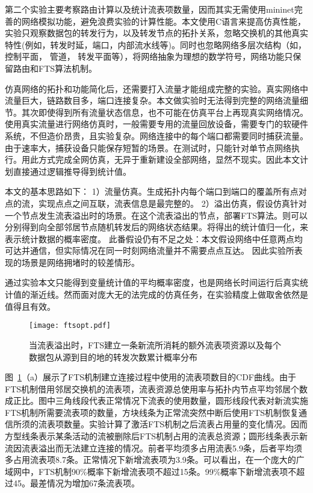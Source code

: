 第二个实验主要考察路由计算以及统计流表项数量，因而其实无需使用mininet完善的网络模拟功能，避免浪费实验的计算性能。本文使用C语言来提高仿真性能，实验只观察数据包的转发行为，以及转发节点的拓扑关系，忽略交换机的其他真实特性(例如，转发时延，端口，内部流水线等)。同时也忽略网络多层次结构（如，控制平面， 管道， 转发平面等），将网络抽象为理想的数学符号，网络功能只保留路由和FTS算法机制。

仿真网络的拓扑和功能简化后，还需要打入流量才能组成完整的实验。真实网络中流量巨大，链路数目多，端口连接复杂。本文做实验时无法得到完整的网络流量细节。其次即使得到所有流量状态信息，也不可能在仿真平台上再现真实网络情况。使用真实流量进行网络仿真时，一般需要专用的流量回放设备，需要专门的软硬件系统，不但造价昂贵，且实验复杂。网络连接中的每个端口都需要同时捕获流量。由于速率大，捕获设备只能保存短暂的场景。在测试时，只能针对单节点网络执行。用此方式完成全网仿真，无异于重新建设全部网络，显然不现实。因此本文计划直接通过逻辑推导得到统计值。

本文的基本思路如下：
1）流量仿真。生成拓扑内每个端口到端口的覆盖所有点对点的流，实现点点之间互联，流表信息是最完整的。
2）溢出仿真，假设仿真针对一个节点发生流表溢出时的场景。在这个流表溢出的节点，部署FTS算法。则可以分别得到向全部邻居节点随机转发后的网络状态结果。将得出的统计值归一化，来表示统计数据的概率密度。
此番假设仍有不足之处：本文假设网络中任意两点均可达并通信，但实际情况在同一时刻网络流量并不需要点点互达。
因此实验所表现的场景是网络拥堵时的较差情形。

通过实验本文只能得到变量统计值的平均概率密度，也是网络长时间运行后真实统计值的渐近线。然而面对庞大无的法完成的仿真任务，在实验精度上做取舍依然是值得且有效。

\begin{figure}[!ht]
	\centering 
	\vspace{-1.5mm} 
	\texttt{[image: ftsopt.pdf]}
	\caption{当流表溢出时，FTS建立一条新流所消耗的额外流表项资源以及每个数据包从源到目的地的转发次数累计概率分布} \label{fig:ftsopt}
\end{figure}

图~\ref{fig:ftsopt}（a）展示了FTS机制建立连接过程中使用的流表项数目的CDF曲线。由于FTS机制借用邻居交换机的流表项，流表资源总使用率与拓扑内节点平均邻居个数成正比。图中三角线段代表正常情况下流表的使用数量，圆形线段代表对新流实施FTS机制所需要流表项的数量，方块线条为正常流突然中断后使用FTS机制恢复通信所须的流表项数量。实验计算了激活FTS机制之后流表占用量的变化情况。因而方型线条表示某条活动的流被删除后FTS机制占用的流表总资源；圆形线条表示新流因流表溢出而无法建立连接的情况。前者平均须多占用流表5.9条，后者平均须多占用流表项8.7条。正常情况下新增流表项为3.9条。可以看出，在一个庞大的广域网中，FTS机制90\%概率下新增流表项不超过15条。99\%概率下新增流表项不超过45。最差情况为增加67条流表项。

